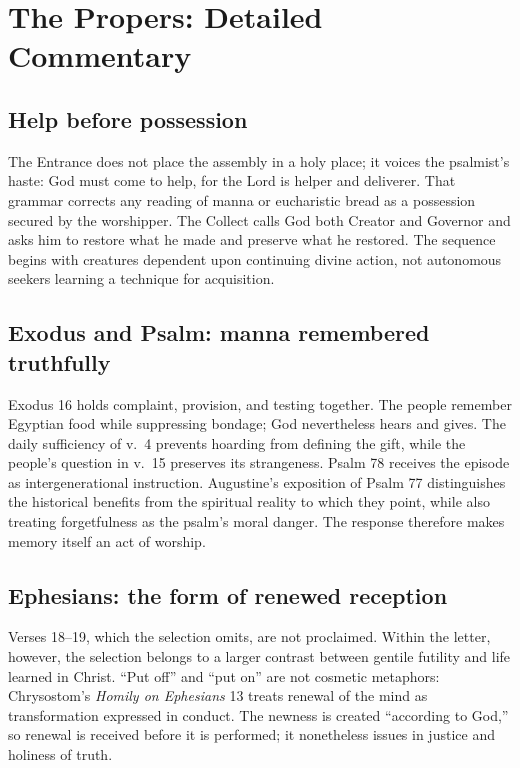 \section*{The Propers: Detailed Commentary}

\subsection*{Help before possession}

The Entrance does not place the assembly in a holy place; it voices the
psalmist's haste: God must come to help, for the Lord is helper and deliverer.
That grammar corrects any reading of manna or eucharistic bread as a
possession secured by the worshipper. The Collect calls God both Creator and
Governor and asks him to restore what he made and preserve what he restored.
The sequence begins with creatures dependent upon continuing divine action,
not autonomous seekers learning a technique for acquisition.

\subsection*{Exodus and Psalm: manna remembered truthfully}

Exodus 16 holds complaint, provision, and testing together. The people
remember Egyptian food while suppressing bondage; God nevertheless hears and
gives. The daily sufficiency of v.~4 prevents hoarding from defining the gift,
while the people's question in v.~15 preserves its strangeness. Psalm 78
receives the episode as intergenerational instruction. Augustine's exposition
of Psalm 77 distinguishes the historical benefits from the spiritual reality
to which they point, while also treating forgetfulness as the psalm's moral
danger. The response therefore makes memory itself an act of worship.

\subsection*{Ephesians: the form of renewed reception}

Verses 18--19, which the selection omits, are not proclaimed.
Within the letter, however, the selection belongs to a larger contrast between
gentile futility and life learned in Christ. ``Put off'' and ``put on'' are
not cosmetic metaphors: Chrysostom's \emph{Homily on Ephesians} 13 treats
renewal of the mind as transformation expressed in conduct. The newness is
created ``according to God,'' so renewal is received before it is performed;
it nonetheless issues in justice and holiness of truth.

